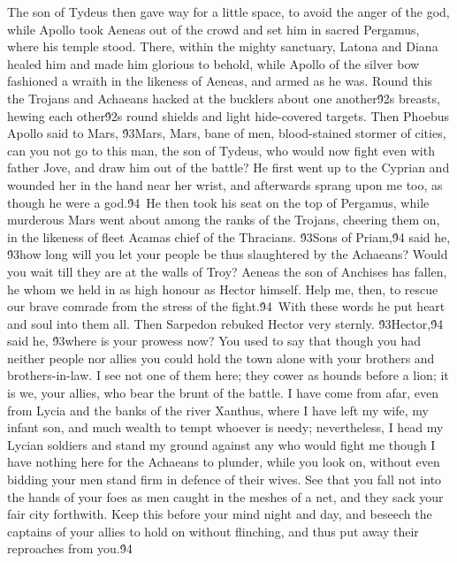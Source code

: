 {The son of Tydeus then gave way for a little space, to avoid the anger of the god, while Apollo took Aeneas out of the crowd and set him in sacred Pergamus, where his temple stood. There, within the mighty sanctuary, Latona and Diana healed him and made him glorious to behold, while Apollo of the silver bow fashioned a wraith in the likeness of Aeneas, and armed as he was. Round this the Trojans and Achaeans hacked at the bucklers about one another\'92s breasts, hewing each other\'92s round shields and light hide-covered targets. Then Phoebus Apollo said to Mars, \'93Mars, Mars, bane of men, blood-stained stormer of cities, can you not go to this man, the son of Tydeus, who would now fight even with father Jove, and draw him out of the battle? He first went up to the Cyprian and wounded her in the hand near her wrist, and afterwards sprang upon me too, as though he were a god.\'94\
He then took his seat on the top of Pergamus, while murderous Mars went about among the ranks of the Trojans, cheering them on, in the likeness of fleet Acamas chief of the Thracians. \'93Sons of Priam,\'94 said he, \'93how long will you let your people be thus slaughtered by the Achaeans? Would you wait till they are at the walls of Troy? Aeneas the son of Anchises has fallen, he whom we held in as high honour as Hector himself. Help me, then, to rescue our brave comrade from the stress of the fight.\'94\
With these words he put heart and soul into them all. Then Sarpedon rebuked Hector very sternly. \'93Hector,\'94 said he, \'93where is your prowess now? You used to say that though you had neither people nor allies you could hold the town alone with your brothers and brothers-in-law. I see not one of them here; they cower as hounds before a lion; it is we, your allies, who bear the brunt of the battle. I have come from afar, even from Lycia and the banks of the river Xanthus, where I have left my wife, my infant son, and much wealth to tempt whoever is needy; nevertheless, I head my Lycian soldiers and stand my ground against any who would fight me though I have nothing here for the Achaeans to plunder, while you look on, without even bidding your men stand firm in defence of their wives. See that you fall not into the hands of your foes as men caught in the meshes of a net, and they sack your fair city forthwith. Keep this before your mind night and day, and beseech the captains of your allies to hold on without flinching, and thus put away their reproaches from you.\'94\
}
